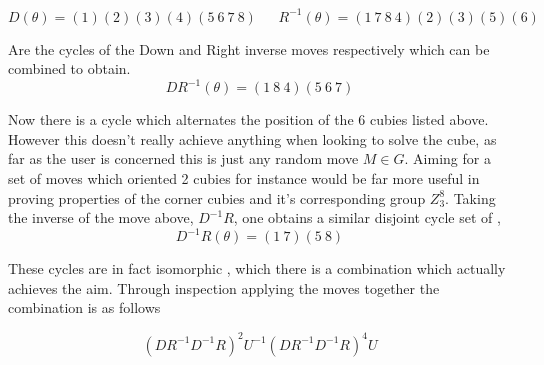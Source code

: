 \documentclass{article}
\begin{document}
\begin{figure}[h]
\centering
\begin{minipage}{3cm}%
%
\end{minipage}%
\end{figure}




\newpage
\begin{equation}
D(\theta)= (1)(2)(3)(4)(5\ 6\ 7\ 8) \ \ \ \ \ \ \ R^{-1}(\theta)= (1\ 7\ 8\ 4)(2)(3)(5)(6)
\end{equation}

Are the cycles of the Down and Right inverse moves respectively which can be combined to obtain. 
\begin{equation}
DR^{-1}(\theta) = (1\ 8\ 4)(5\ 6\ 7)
\end{equation}

Now there is a cycle which alternates the position of the 6 cubies listed above. However this doesn't really achieve anything when looking to solve the cube, as far as the user is concerned this is just any random move $M \in G$. Aiming for a set of moves which oriented 2 cubies for instance would be far more useful in proving properties of the corner cubies and it's corresponding group $Z_{3}^{8}$. Taking the inverse of the move above, $D^{-1}R$, one obtains a similar disjoint cycle set of , 
\begin{equation}
D^{-1}R(\theta) = (1\ 7)(5\ 8)
\end{equation}


These cycles are in fact isomorphic , which there is a combination which actually achieves the aim. Through inspection applying the moves together the combination is as follows

\begin{equation}
(DR^{-1}D^{-1}R)^{2}  U^{-1}  (DR^{-1}D^{-1}R)^{4} U
\end{equation}
\begin{figure}[h]
\centering
  \RubikCubeSolved%
  \hspace{.4cm}
\end{figure}
\end{document}
